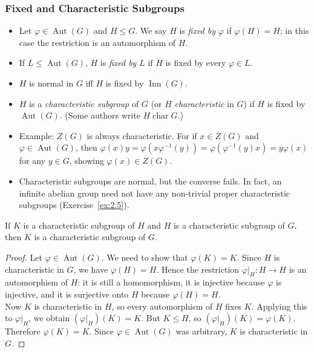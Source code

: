 \documentclass[../Odyssey_Project.tex]{subfiles}
\begin{document}
\subsubsection*{Fixed and Characteristic Subgroups}
\begin{itemize}
    \item Let $\varphi \in \operatorname{Aut}(G)$ and $H \leq G$. We say $H$ is \emph{fixed by} $\varphi$ if $\varphi(H) = H$; in this case the restriction is an automorphism of $H$.
    \item If $L \leq \operatorname{Aut}(G)$, $H$ is \emph{fixed by} $L$ if $H$ is fixed by every $\varphi \in L$.
    \item $H$ is normal in $G$ iff $H$ is fixed by $\operatorname{Inn}(G)$.
    \item $H$ is a \emph{characteristic subgroup} of $G$ (or $H$ \emph{characteristic} in $G$) if $H$ is fixed by $\operatorname{Aut}(G)$. (Some authors write $H \operatorname{char} G$.)
    \item Example: $Z(G)$ is always characteristic. For if $x \in Z(G)$ and $\varphi \in \operatorname{Aut}(G)$, then $\varphi(x)y = \varphi(x \varphi^{-1}(y)) = \varphi(\varphi^{-1}(y)x) = y\varphi(x)$ for any $y \in G$, showing $\varphi(x) \in Z(G)$.
    \item Characteristic subgroups are normal, but the converse fails. In fact, an infinite abelian group need not have any non-trivial proper characteristic subgroups (Exercise~\ref{ex:2.5}).
\end{itemize}

\begin{lemma}
\label{lem:2.4}
If $K$ is a characteristic subgroup of $H$ and $H$ is a characteristic subgroup of $G$, then $K$ is a characteristic subgroup of $G$.
\end{lemma}
\begin{proof}
    Let $\varphi \in \operatorname{Aut}(G)$. We need to show that $\varphi(K) = K$. Since $H$ is characteristic in $G$, we have $\varphi(H) = H$. Hence the restriction $\varphi|_H \colon H \to H$ is an automorphism of $H$: it is still a homomorphism, it is injective because $\varphi$ is injective, and it is surjective onto $H$ because $\varphi(H) = H$. \\
    Now $K$ is characteristic in $H$, so every automorphism of $H$ fixes $K$. Applying this to $\varphi|_H$, we obtain $(\varphi|_H)(K) = K$. But $K \leq H$, so $(\varphi|_H)(K) = \varphi(K)$. Therefore $\varphi(K) = K$. Since $\varphi \in \operatorname{Aut}(G)$ was arbitrary, $K$ is characteristic in $G$.
\end{proof}
\end{document}
